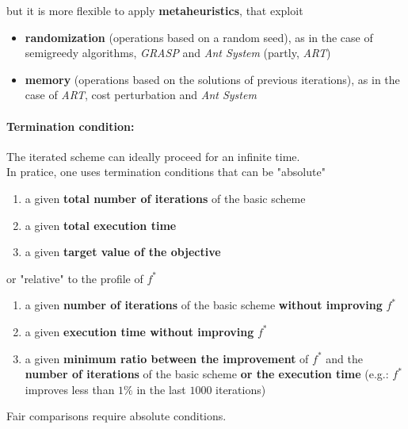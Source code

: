 \documentclass[11pt]{article}
\begin{document}
	but it is more flexible to apply \textbf{metaheuristics}, that exploit
	\begin{itemize}
		\item \textbf{randomization} (operations based on a random seed), as in the case of semigreedy algorithms, \textit{GRASP} and \textit{Ant System} (partly, \textit{ART})
		
		\item \textbf{memory} (operations based on the solutions of previous iterations), as in the case of \textit{ART}, cost perturbation and \textit{Ant System}
	\end{itemize}
	
	\paragraph{Termination condition:} The iterated scheme can ideally proceed for an infinite time.\\
	In pratice, one uses termination conditions that can be "absolute"
	
	\begin{enumerate}
		\item a given \textbf{total number of iterations} of the basic scheme
		
		\item a given \textbf{total execution time}
		
		\item a given \textbf{target value of the objective}
	\end{enumerate}
	
	or "relative" to the profile of $f^\ast$
	\begin{enumerate}
		\item a given \textbf{number of iterations} of the basic scheme \textbf{without improving} $f^\ast$
		
		\item a given \textbf{execution time without improving} $f^\ast$
		
		\item a given \textbf{minimum ratio between the improvement} of $f^\ast$ and the \textbf{number of iterations} of the basic scheme \textbf{or the execution time} (e.g.: $f^\ast$ improves less than $1\%$ in the last $1000$ iterations)
	\end{enumerate}
	
	Fair comparisons require absolute conditions.
	
	\newpage
	
\end{document}
